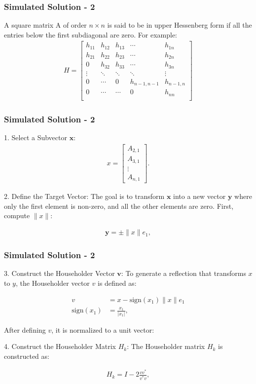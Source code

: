 \documentclass{beamer}
\theoremstyle{remark}
\providecommand{\norm}[1]{\lVert#1\rVert}
\let\vec\mathbf
\numberwithin{equation}{section}
\begin{document}
\begin{frame}
	\frametitle{Simulated Solution - 2}
	A square matrix A of order $n \times n$ is said to be in upper Hessenberg form if all the entries below the first subdiagonal are zero.
For example:
\begin{align}
	H = 
	\begin{bmatrix}
		h_{11} & h_{12} & h_{13} & \cdots & h_{1n} \\
		h_{21} & h_{22} & h_{23} & \cdots & h_{2n} \\
		0      & h_{32} & h_{33} & \cdots & h_{3n} \\
		\vdots & \ddots & \ddots & \ddots & \vdots \\
		0      & \cdots & 0      & h_{n-1,n-1} & h_{n-1,n} \\
		0      & \cdots & \cdots & 0          & h_{nn} \\
	\end{bmatrix}
\end{align}

\end{frame}
\begin{frame}
	\frametitle{Simulated Solution - 2}
	1. Select a Subvector $\vec{x}$:
\begin{align}
	x = \begin{bmatrix}
		A_{2,1} \\
		A_{3,1} \\
		\vdots \\
		A_{n,1}
	\end{bmatrix}.
\end{align}

2. Define the Target Vector:
	The goal is to transform $\vec{x}$ into a new vector $\vec{y}$ where only the first element is non-zero, and all the other elements are zero. First, compute $\norm{x}$:

		\begin{align}
			\vec{y} = \pm \norm{x} e_1,
		\end{align}
\end{frame}
\begin{frame}
	\frametitle{Simulated Solution - 2}
3. Construct the Householder Vector $\vec{v}$:
	To generate a reflection that transforms \( x \) to \( y \), the Householder vector \( v \) is defined as:

		\begin{align}
			v &= x - \text{sign}(x_1) \norm{x} e_1\\
			\text{sign}(x_1) &= \frac{x_1}{|x_1|},
		\end{align}

	After defining \( v \), it is normalized to a unit vector:

4. Construct the Householder Matrix \( H_k \):
	The Householder matrix \( H_k \) is constructed as:

		\begin{align}
		H_k = I - 2 \frac{v v^*}{v^* v},
		\end{align}
\end{frame}
\end{document}
